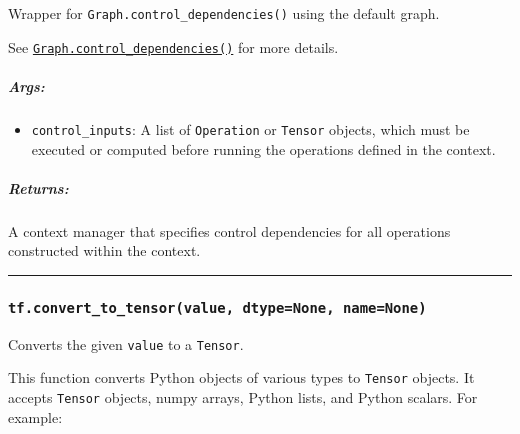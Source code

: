 Wrapper for \lstinline{Graph.control_dependencies()} using the default
graph.

See
\href{../../api_docs/python/framework.md\#Graph.control_dependencies}{\lstinline{Graph.control_dependencies()}}
for more details.

\subparagraph{Args: }\label{args-23}

\begin{itemize}
\tightlist
\item
  \lstinline{control_inputs}: A list of \lstinline{Operation} or
  \lstinline{Tensor} objects, which must be executed or computed before
  running the operations defined in the context.
\end{itemize}

\subparagraph{Returns: }\label{returns-26}

A context manager that specifies control dependencies for all operations
constructed within the context.

\begin{center}\rule{0.5\linewidth}{\linethickness}\end{center}

\subsubsection{\texorpdfstring{\lstinline{tf.convert_to_tensor(value, dtype=None, name=None)}
}{tf.convert_to_tensor(value, dtype=None, name=None) }}\label{tf.convertux5ftoux5ftensorvalue-dtypenone-namenone}

Converts the given \lstinline{value} to a \lstinline{Tensor}.

This function converts Python objects of various types to
\lstinline{Tensor} objects. It accepts \lstinline{Tensor} objects, numpy
arrays, Python lists, and Python scalars. For example:

\begin{Shaded}
\begin{Highlighting}[]
  
\OperatorTok{=} \NormalTok{, }\NormalTok{, }\NormalTok{))}

 
  \OperatorTok{=} \OperatorTok{=}
   \OperatorTok{+} 

\OperatorTok{=} \NormalTok{my_func(tf.constant([[}\NormalTok{, }\NormalTok{], [}\NormalTok{, }\NormalTok{]]))}
\OperatorTok{=} \NormalTok{my_func([[}\NormalTok{, }\NormalTok{], [}\NormalTok{, }\NormalTok{]])}
\OperatorTok{=} \NormalTok{my_func(np.array([[}\NormalTok{, }\NormalTok{], [}\NormalTok{, }\NormalTok{]], dtype}\OperatorTok{=}
\end{Highlighting}
\end{Shaded}

